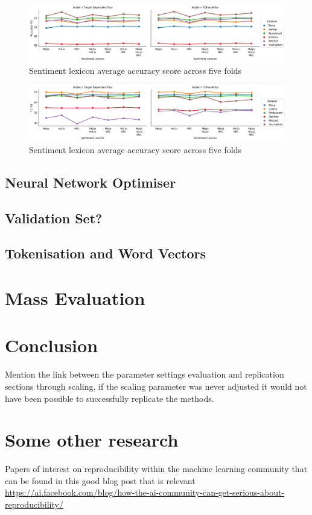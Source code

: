 \begin{figure}[!htb]
    \centering
    \includegraphics[scale=0.3]{images/reproducibility/Parameters/Sentiment_Lexicons/Sentiment_Lexicon_Accuracy_Plot.png}
    \caption{Sentiment lexicon average accuracy score across five folds}
    \label{fig:repro_param_senti_lex_avg_acc}
\end{figure}
\begin{figure}[!htb]
    \centering
    \includegraphics[scale=0.3]{images/reproducibility/Parameters/Sentiment_Lexicons/Sentiment_Lexicon_F1_Plot.png}
    \caption{Sentiment lexicon average accuracy score across five folds}
    \label{fig:repro_param_senti_lex_avg_f1}
\end{figure}
\newpage
\FloatBarrier
\subsection{Neural Network Optimiser}
\subsection{Validation Set?}
\subsection{Tokenisation and Word Vectors}
\section{Mass Evaluation}
\section{Conclusion}
Mention the link between the parameter settings evaluation and replication sections through scaling, if the scaling parameter was never adjusted it would not have been possible to successfully replicate the methods.
\label{section:repro_mass_eval}

\section{Some other research}
Papers of interest on reproducibility within the machine learning community that can be found in this good blog post that is relevant \url{https://ai.facebook.com/blog/how-the-ai-community-can-get-serious-about-reproducibility/}